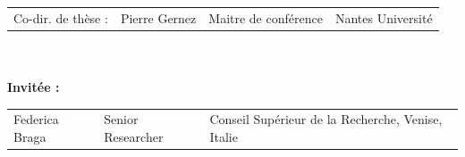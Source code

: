 \documentclass[
  letterpaper,
  11pt,
  english,
  singlespacing,
  headsepline]{MastersDoctoralThesis}
\newcommand{\startonrightwithgap}{%
  \clearpage
  \ifodd\value{page}
    \thispagestyle{empty}\mbox{}\clearpage
    \thispagestyle{empty}\mbox{}\clearpage
  \else
    \thispagestyle{empty}\mbox{}\clearpage
  \fi
}
\begin{document}
\begin{titlepage}
\begin{tabular}{@{}l l l l@{}}
    {\fontsize{10}{14}\selectfont \textcolor{textgray}{Co-dir. de thèse :}} & 
    {\fontsize{10}{14}\selectfont \textcolor{textgray}{Pierre Gernez}} & 
    {\fontsize{10}{14}\selectfont \textcolor{textgray}{Maitre de conférence}} & 
    {\fontsize{10}{14}\selectfont \textcolor{textgray}{Nantes Université}} \\
\end{tabular} \\\\

{\fontsize{11}{15}\selectfont \textbf{Invitée : }}


\begin{tabular}{@{}l l l@{}}
    {\fontsize{10}{14}\selectfont \textcolor{textgray}{Federica Braga}} & 
    {\fontsize{10}{14}\selectfont \textcolor{textgray}{Senior Researcher}} & 
    {\fontsize{10}{14}\selectfont \textcolor{textgray}{Conseil Supérieur de la Recherche, Venise, Italie}} \\

\end{tabular}
\end{titlepage}

\restoregeometry

\renewcommand{\familydefault}{\rmdefault}




% 
  \startonrightwithgap
  \begin{acknowledgements}
    \addchaptertocentry{\acknowledgementname} %
          
      \end{acknowledgements}
\end{document}
